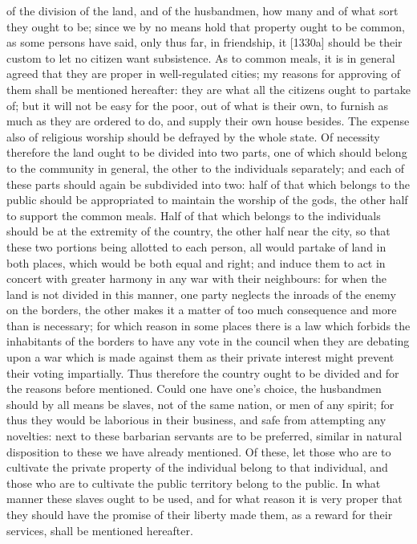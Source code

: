of the division of the land, and of the husbandmen, how many and of what
sort they ought to be; since we by no means hold that property ought to be
common, as some persons have said, only thus far, in friendship, it
[1330a] should be their custom to let no citizen want subsistence. As to
common meals, it is in general agreed that they are proper in
well-regulated cities; my reasons for approving of them shall be mentioned
hereafter: they are what all the citizens ought to partake of; but it will
not be easy for the poor, out of what is their own, to furnish as much as
they are ordered to do, and supply their own house besides. The expense
also of religious worship should be defrayed by the whole state. Of
necessity therefore the land ought to be divided into two parts, one of
which should belong to the community in general, the other to the
individuals separately; and each of these parts should again be subdivided
into two: half of that which belongs to the public should be appropriated
to maintain the worship of the gods, the other half to support the common
meals. Half of that which belongs to the individuals should be at the
extremity of the country, the other half near the city, so that these two
portions being allotted to each person, all would partake of land in both
places, which would be both equal and right; and induce them to act in
concert with greater harmony in any war with their neighbours: for when
the land is not divided in this manner, one party neglects the inroads of
the enemy on the borders, the other makes it a matter of too much
consequence and more than is necessary; for which reason in some places
there is a law which forbids the inhabitants of the borders to have any
vote in the council when they are debating upon a war which is made
against them as their private interest might prevent their voting
impartially. Thus therefore the country ought to be divided and for the
reasons before mentioned. Could one have one's choice, the husbandmen
should by all means be slaves, not of the same nation, or men of any
spirit; for thus they would be laborious in their business, and safe from
attempting any novelties: next to these barbarian servants are to be
preferred, similar in natural disposition to these we have already
mentioned. Of these, let those who are to cultivate the private property
of the individual belong to that individual, and those who are to
cultivate the public territory belong to the public. In what manner these
slaves ought to be used, and for what reason it is very proper that they
should have the promise of their liberty made them, as a reward for their
services, shall be mentioned hereafter.

